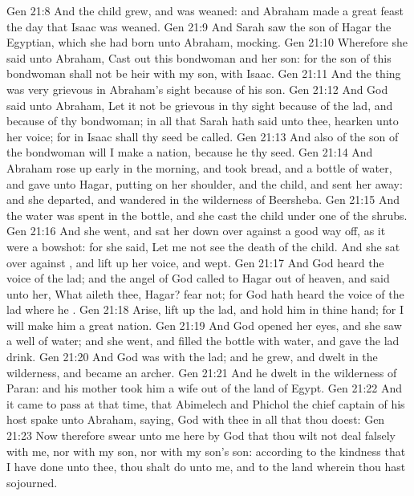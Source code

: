 \vs Gen 21:8 And the child grew, and was weaned: and Abraham made a great feast the  day that Isaac was weaned.
\vs Gen 21:9 And Sarah saw the son of Hagar the Egyptian, which she had born unto Abraham, mocking.
\vs Gen 21:10 Wherefore she said unto Abraham, Cast out this bondwoman and her son: for the son of this bondwoman shall not be heir with my son,  with Isaac.
\vs Gen 21:11 And the thing was very grievous in Abraham's sight because of his son.
\vs Gen 21:12 And God said unto Abraham, Let it not be grievous in thy sight because of the lad, and because of thy bondwoman; in all that Sarah hath said unto thee, hearken unto her voice; for in Isaac shall thy seed be called.
\vs Gen 21:13 And also of the son of the bondwoman will I make a nation, because he  thy seed.
\vs Gen 21:14 And Abraham rose up early in the morning, and took bread, and a bottle of water, and gave  unto Hagar, putting  on her shoulder, and the child, and sent her away: and she departed, and wandered in the wilderness of Beersheba.
\vs Gen 21:15 And the water was spent in the bottle, and she cast the child under one of the shrubs.
\vs Gen 21:16 And she went, and sat her down over against  a good way off, as it were a bowshot: for she said, Let me not see the death of the child. And she sat over against , and lift up her voice, and wept.
\vs Gen 21:17 And God heard the voice of the lad; and the angel of God called to Hagar out of heaven, and said unto her, What aileth thee, Hagar? fear not; for God hath heard the voice of the lad where he .
\vs Gen 21:18 Arise, lift up the lad, and hold him in thine hand; for I will make him a great nation.
\vs Gen 21:19 And God opened her eyes, and she saw a well of water; and she went, and filled the bottle with water, and gave the lad drink.
\vs Gen 21:20 And God was with the lad; and he grew, and dwelt in the wilderness, and became an archer.
\vs Gen 21:21 And he dwelt in the wilderness of Paran: and his mother took him a wife out of the land of Egypt.
\vs Gen 21:22 And it came to pass at that time, that Abimelech and Phichol the chief captain of his host spake unto Abraham, saying, God  with thee in all that thou doest:
\vs Gen 21:23 Now therefore swear unto me here by God that thou wilt not deal falsely with me, nor with my son, nor with my son's son:  according to the kindness that I have done unto thee, thou shalt do unto me, and to the land wherein thou hast sojourned.
